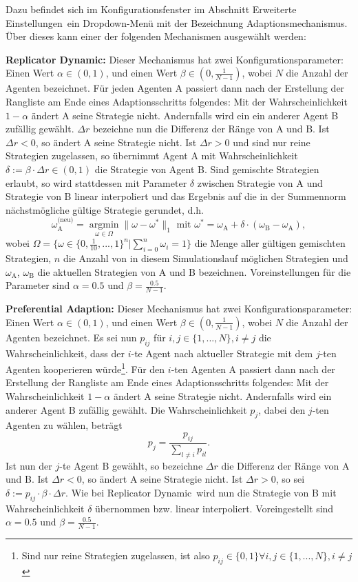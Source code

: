 \documentclass[parskip=full,11pt,twoside]{scrartcl}
\def\adapt{Adaptionsschritt}
\begin{document}
Dazu befindet sich im Konfigurationsfenster im Abschnitt \glqq Erweiterte Einstellungen\grqq\ ein Dropdown-Menü mit der Bezeichnung \glqq Adaptionsmechanismus\grqq. Über dieses kann einer der folgenden Mechanismen ausgewählt werden:

\textbf{Replicator Dynamic:}
Dieser Mechanismus hat zwei Konfigurationsparameter: Einen Wert \(\alpha \in (0,1)\), und einen Wert \(\beta \in (0,\frac{1}{N-1})\), wobei \(N\) die Anzahl der Agenten bezeichnet. Für jeden Agenten A passiert dann nach der Erstellung der Rangliste am Ende eines \adapt s folgendes: Mit der Wahrscheinlichkeit \(1 - \alpha\) ändert A seine Strategie nicht. Andernfalls wird ein ein anderer Agent B zufällig gewählt. \(\Delta r\) bezeichne nun die Differenz der Ränge von A und B. Ist \(\Delta r < 0\), so ändert A seine Strategie nicht. Ist \(\Delta r > 0\) und sind nur reine Strategien zugelassen, so übernimmt Agent A mit Wahrscheinlichkeit \(\delta := \beta \cdot \Delta r \in (0,1)\) die Strategie von Agent B. Sind gemischte Strategien erlaubt, so wird stattdessen mit Parameter \(\delta\) zwischen Strategie von A und Strategie von B linear interpoliert und das Ergebnis auf die in der Summennorm nächstmögliche gültige Strategie gerundet, d.h.
\[
\omega_\text{A}^\text{(neu)} = \underset{\omega \in \Omega}{\operatorname{arg min}} \|\omega - \omega^*\|_1 \text{  mit  } \omega^* = \omega_\text{A} + \delta \cdot (\omega_\text{B} - \omega_\text{A}),
\]
wobei \(\Omega = \{\omega \in \{0,\frac{1}{10},...,1\}^n | \sum_{i=0}^n \omega_i = 1\}\) die Menge aller gültigen gemischten Strategien, \(n\) die Anzahl von in diesem Simulationslauf möglichen Strategien und \(\omega_\text{A}\), \(\omega_\text{B}\) die aktuellen Strategien von A und B bezeichnen. Voreinstellungen für die Parameter sind \(\alpha = 0.5\) und \(\beta = \frac{0.5}{N - 1}\).

\textbf{Preferential Adaption:}
Dieser Mechanismus hat zwei Konfigurationsparameter: Einen Wert \(\alpha \in (0,1)\), und einen Wert \(\beta \in (0,\frac{1}{N-1})\), wobei \(N\) die Anzahl der Agenten bezeichnet. Es sei nun \(p_{ij}\) für \(i,j \in \{1,...,N\}, i \neq j\) die Wahrscheinlichkeit, dass der \(i\)-te Agent nach aktueller Strategie mit dem \(j\)-ten Agenten kooperieren würde\footnote{Sind nur reine Strategien zugelassen, ist also \(p_{ij} \in \{0,1\} \forall i,j \in \{1,...,N\}, i \neq j\)}. Für den \(i\)-ten Agenten A passiert dann nach der Erstellung der Rangliste am Ende eines \adapt s folgendes: Mit der Wahrscheinlichkeit \(1 - \alpha\) ändert A seine Strategie nicht. Andernfalls wird ein anderer Agent B zufällig gewählt. Die Wahrscheinlichkeit \(p_j\), dabei den \(j\)-ten Agenten zu wählen, beträgt
\[
p_j = \frac{p_{ij}}{\sum_{l \neq i} p_{il}}.
\]
Ist nun der \(j\)-te Agent B gewählt, so bezeichne \(\Delta r\) die Differenz der Ränge von A und B. Ist \(\Delta r < 0\), so ändert A seine Strategie nicht. Ist \(\Delta r > 0\), so sei \(\delta := p_{ij} \cdot \beta \cdot \Delta r\). Wie bei \glqq Replicator Dynamic\grqq\ wird nun die Strategie von B mit Wahrscheinlichkeit \(\delta\) übernommen bzw. linear interpoliert. Voreingestellt sind \(\alpha = 0.5\) und \(\beta = \frac{0.5}{N - 1}\).
\end{document}
